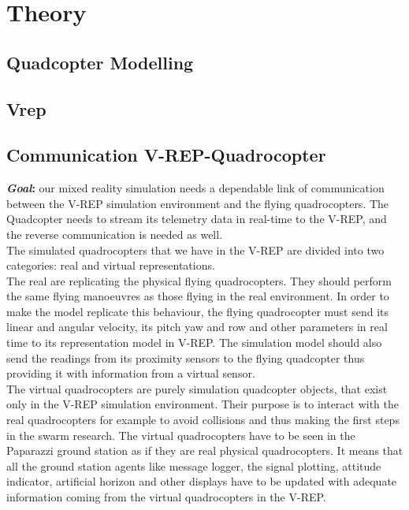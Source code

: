 \chapter{Theory}
\label{sec:theo}


\section{Quadcopter Modelling}





\section{Vrep}





\section{Communication V-REP-Quadrocopter}
\textbf{\textit{Goal}:} our mixed reality simulation needs a dependable link of communication between the V-REP simulation environment and the flying quadrocopters. The Quadcopter needs to stream its telemetry data in real-time to the V-REP, and the reverse communication is needed as well.\\
The simulated quadrocopters that we have in the V-REP are divided into two categories: real and virtual representations.\\ 
The real are replicating the physical flying quadrocopters. They should perform the same flying manoeuvres as those flying in the real environment. In order to make the model replicate this behaviour, the flying quadrocopter must send its linear and angular velocity, its pitch yaw and row and other parameters in real time to its representation model in V-REP. The simulation model should also send the readings from its proximity sensors to the flying quadcopter thus providing it with information from a virtual sensor. \\
The virtual quadrocopters are purely simulation quadcopter objects, that exist only in the V-REP simulation environment. Their purpose is to interact with the real quadrocopters for example to avoid collisions and thus making the first steps in the swarm research. The virtual quadrocopters have to be seen in the Paparazzi ground station as if they are real physical quadrocopters. It means that all the ground station agents like message logger, the signal plotting, attitude indicator, artificial horizon and other displays have to be updated with adequate information coming from the virtual quadrocopters in the V-REP.

